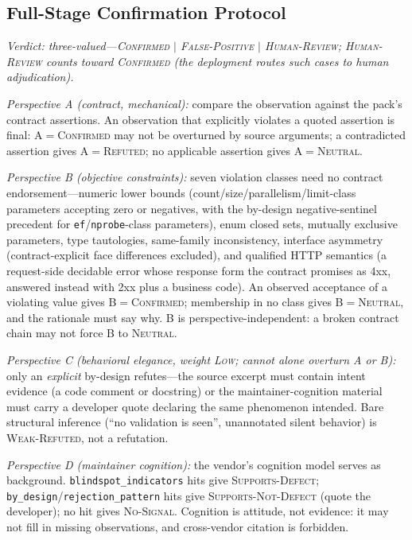 \documentclass[acmsmall,screen,review,anonymous]{acmart}
\begin{document}
\subsection{Full-Stage Confirmation Protocol}
\label{app:full-prompt}

\emph{Verdict: three-valued---\textsc{Confirmed} $\mid$ \textsc{False-Positive} $\mid$ \textsc{Human-Review}; \textsc{Human-Review} counts toward \textsc{Confirmed} (the deployment routes such cases to human adjudication).}

\emph{Perspective A (contract, mechanical):} compare the observation against the pack's contract assertions. An observation that explicitly violates a quoted assertion is final: A${=}$\textsc{Confirmed} may not be overturned by source arguments; a contradicted assertion gives A${=}$\textsc{Refuted}; no applicable assertion gives A${=}$\textsc{Neutral}.

\emph{Perspective B (objective constraints):} seven violation classes need no contract endorsement---numeric lower bounds (count/size/parallelism/limit-class parameters accepting zero or negatives, with the by-design negative-sentinel precedent for \texttt{ef}/\texttt{nprobe}-class parameters), enum closed sets, mutually exclusive parameters, type tautologies, same-family inconsistency, interface asymmetry (contract-explicit face differences excluded), and qualified HTTP semantics (a request-side decidable error whose response form the contract promises as 4xx, answered instead with 2xx plus a business code). An observed acceptance of a violating value gives B${=}$\textsc{Confirmed}; membership in no class gives B${=}$\textsc{Neutral}, and the rationale must say why. B is perspective-independent: a broken contract chain may not force B to \textsc{Neutral}.

\emph{Perspective C (behavioral elegance, weight \textsc{Low}; cannot alone overturn A or B):} only an \emph{explicit} by-design refutes---the source excerpt must contain intent evidence (a code comment or docstring) or the maintainer-cognition material must carry a developer quote declaring the same phenomenon intended. Bare structural inference (``no validation is seen'', unannotated silent behavior) is \textsc{Weak-Refuted}, not a refutation.

\emph{Perspective D (maintainer cognition):} the vendor's cognition model serves as background. \texttt{blindspot\_indicators} hits give \textsc{Supports-Defect}; \texttt{by\_design}/\texttt{rejection\_pattern} hits give \textsc{Supports-Not-Defect} (quote the developer); no hit gives \textsc{No-Signal}. Cognition is attitude, not evidence: it may not fill in missing observations, and cross-vendor citation is forbidden.
\end{document}
